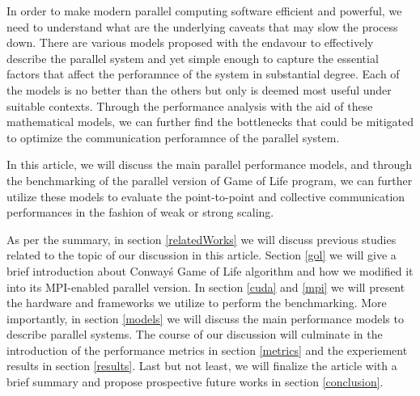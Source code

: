

In order to make modern parallel computing software efficient and powerful, we need to understand what are the underlying caveats that may slow the process down. There are various models proposed with the endavour to effectively describe the parallel system and yet simple enough to capture the essential factors that affect the perforamnce of the system in substantial degree. Each of the models is no better than the others but only is deemed most useful under suitable contexts. Through the performance analysis with the aid of these mathematical models, we can further find the bottlenecks that could be mitigated to optimize the communication perforamnce of the parallel system. 

In this article, we will discuss the main parallel performance models, and through the benchmarking of the parallel version of Game of Life program, we can further utilize these models to evaluate the point-to-point and collective communication performances in the fashion of weak or strong scaling. 

As per the summary, in section \ref{relatedWorks} we will discuss previous studies related to the topic of our discussion in this article. Section \ref{gol} we will give a brief introduction about Conway\'s Game of Life algorithm and how we modified it into its MPI-enabled parallel version. In section \ref{cuda} and \ref{mpi} we will present the hardware and frameworks we utilize to perform the benchmarking. More importantly, in section \ref{models} we will discuss the main performance models to describe parallel systems. The course of our discussion will culminate in the introduction of the performance metrics in section \ref{metrics} and the experiement results in section \ref{results}. Last but not least, we will finalize the article with a brief summary and propose prospective future works in section \ref{conclusion}.

